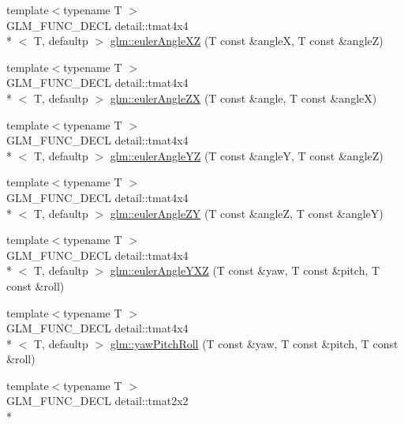 \begin{DoxyCompactItemize}
\item 
{\footnotesize template$<$typename T $>$ }\\G\-L\-M\-\_\-\-F\-U\-N\-C\-\_\-\-D\-E\-C\-L detail\-::tmat4x4\\*
$<$ T, defaultp $>$ \hyperlink{group__gtx__euler__angles_ga61110cb520fbf21dd541cf4e25d81a65}{glm\-::euler\-Angle\-X\-Z} (T const \&angle\-X, T const \&angle\-Z)
\item 
{\footnotesize template$<$typename T $>$ }\\G\-L\-M\-\_\-\-F\-U\-N\-C\-\_\-\-D\-E\-C\-L detail\-::tmat4x4\\*
$<$ T, defaultp $>$ \hyperlink{group__gtx__euler__angles_ga5766bbe3f5b17b5c33ed21b2933ff278}{glm\-::euler\-Angle\-Z\-X} (T const \&angle, T const \&angle\-X)
\item 
{\footnotesize template$<$typename T $>$ }\\G\-L\-M\-\_\-\-F\-U\-N\-C\-\_\-\-D\-E\-C\-L detail\-::tmat4x4\\*
$<$ T, defaultp $>$ \hyperlink{group__gtx__euler__angles_ga4bff0f8324770261d3a6ddadd790ec22}{glm\-::euler\-Angle\-Y\-Z} (T const \&angle\-Y, T const \&angle\-Z)
\item 
{\footnotesize template$<$typename T $>$ }\\G\-L\-M\-\_\-\-F\-U\-N\-C\-\_\-\-D\-E\-C\-L detail\-::tmat4x4\\*
$<$ T, defaultp $>$ \hyperlink{group__gtx__euler__angles_gaeabd76319f5a19188a0423769950df76}{glm\-::euler\-Angle\-Z\-Y} (T const \&angle\-Z, T const \&angle\-Y)
\item 
{\footnotesize template$<$typename T $>$ }\\G\-L\-M\-\_\-\-F\-U\-N\-C\-\_\-\-D\-E\-C\-L detail\-::tmat4x4\\*
$<$ T, defaultp $>$ \hyperlink{group__gtx__euler__angles_gab9bc80f4f579efd8f0d161e8b58ff452}{glm\-::euler\-Angle\-Y\-X\-Z} (T const \&yaw, T const \&pitch, T const \&roll)
\item 
{\footnotesize template$<$typename T $>$ }\\G\-L\-M\-\_\-\-F\-U\-N\-C\-\_\-\-D\-E\-C\-L detail\-::tmat4x4\\*
$<$ T, defaultp $>$ \hyperlink{group__gtx__euler__angles_gaf6f927d06835272cd6a61ee3f8f65f5e}{glm\-::yaw\-Pitch\-Roll} (T const \&yaw, T const \&pitch, T const \&roll)
\item 
{\footnotesize template$<$typename T $>$ }\\G\-L\-M\-\_\-\-F\-U\-N\-C\-\_\-\-D\-E\-C\-L detail\-::tmat2x2\\*

\end{DoxyCompactItemize}
